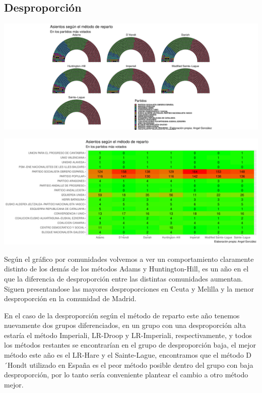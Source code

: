 \documentclass[12pt,a4paper,]{book}
\numberwithin{dummy}{section}
\theoremstyle{ocrenumbox}
\theoremstyle{blacknumex}
\theoremstyle{blacknumbox}
\theoremstyle{ocrenum}
\theoremstyle{ocrenum}
\begin{document}
\hypertarget{desproporciuxf3n-11}{%
\subsection{Desproporción}\label{desproporciuxf3n-11}}

\begin{center}\includegraphics[width=1\linewidth]{figurasR/unnamed-chunk-107-1} \end{center}

\begin{center}\includegraphics[width=1\linewidth]{figurasR/unnamed-chunk-107-2} \end{center}

Según el gráfico por comunidades volvemos a ver un comportamiento
claramente distinto de los demás de los métodos Adams y Huntington-Hill,
es un año en el que la diferencia de desproporción entre las distintas
comunidades aumentan. Siguen presentandose las mayores desproporciones
en Ceuta y Melilla y la menor desproporción en la comunidad de Madrid.

En el caso de la desproporción según el método de reparto este año
tenemos nuevamente dos grupos diferenciados, en un grupo con una
desproporción alta estaría el método Imperiali, LR-Droop y LR-Imperiali,
respectivamente, y todos los métodos restantes se encontrarían en el
grupo de desproporción baja, el mejor método este año es el LR-Hare y el
Sainte-Lague, encontramos que el método D´Hondt utilizado en España es
el peor método posible dentro del grupo con baja desproporción, por lo
tanto sería conveniente plantear el cambio a otro método mejor.
\end{document}
